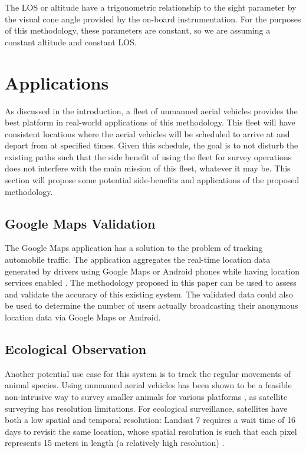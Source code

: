 \documentclass[conf]{new-aiaa}
\begin{document}
The LOS or altitude have a trigonometric relationship to the sight parameter by the visual cone angle provided by the on-board instrumentation. For the purposes of this methodology, these parameters are constant, so we are assuming a constant altitude and constant LOS.




\section{Applications}

As discussed in the introduction, a fleet of unmanned aerial vehicles provides the best platform in real-world applications of this methodology. This fleet will have consistent locations where the aerial vehicles will be scheduled to arrive at and depart from at specified times. Given this schedule, the goal is to not disturb the existing paths such that the side benefit of using the fleet for survey operations does not interfere with the main mission of this fleet, whatever it may be. This section will propose some potential side-benefits and applications of the proposed methodology.

\subsection{Google Maps Validation}
The Google Maps application has a solution to the problem of tracking automobile traffic. The application aggregates the real-time location data generated by drivers using Google Maps or Android phones while having location services enabled \cite{barth2009googlemaps}. The methodology proposed in this paper can be used to assess and validate the accuracy of this existing system. The validated data could also be used to determine the number of users actually broadcasting their anonymous location data via Google Maps or Android.

\subsection{Ecological Observation}
Another potential use case for this system is to track the regular movements of animal species. Using unmanned aerial vehicles has been shown to be a feasible non-intrusive way to survey smaller animals for various platforms \cite{mcevoy2016disturbanceEffectsSpeciesRecognition}, as satellite surveying has resolution limitations. For ecological surveillance, satellites have both a low spatial and temporal resolution: Landsat 7 requires a wait time of 16 days to revisit the same location, whose spatial resolution is such that each pixel represents 15 meters in length (a relatively high resolution) \cite{kerr2003fromSpaceToSpecies}.
\end{document}
